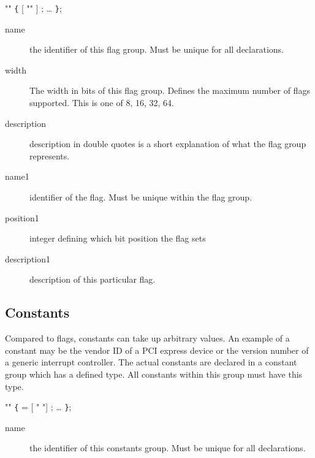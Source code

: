 \documentclass[a4paper,11pt,twoside]{report}
\begin{document}
{{\begin{syntax}
   "" \verb+{+
      [ "" ] ;
    \ldots
\verb+}+;
\end{syntax}

\begin{description}
    \item[name] the identifier of this flag group. Must be unique for all 
                declarations.
    
    \item [width] The width in bits of this flag group. Defines the maximum 
                  number of flags supported. This is one of 8, 16, 32, 64.
    
    \item [description] description in double quotes is a short explanation of
                        what the flag group represents.
    
    \item [name1] identifier of the flag. Must be unique within the flag 
                  group. 
    
    \item [position1] integer defining which bit position the flag sets
    
    \item [description1] description of this particular flag.
\end{description}

\subsection{Constants}
\label{sec:decl:constants}

Compared to flags, constants can take up arbitrary values. An example of a 
constant may be the vendor ID of a PCI express device or the version number
of a generic interrupt controller. The actual constants are declared in a 
constant group which has a defined type. All constants within this group 
must have this type.

\begin{syntax}
   "" \verb+{+
     =  [ " "] ;
    \ldots
\verb+}+;
\end{syntax}

\begin{description}
    \item[name] the identifier of this constants group. Must be unique for all 
                declarations.
    

\end{description}}}
\end{document}

